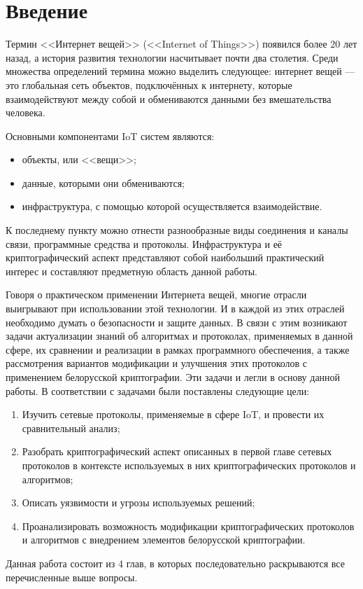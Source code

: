 \chapter*{Введение}
 
 	Термин <<Интернет вещей>> (<<Internet of Things>>) появился более 20 лет назад, а история развития
 	технологии насчитывает почти два столетия. Среди множества определений термина можно выделить
 	следующее: интернет вещей --- это глобальная сеть объектов, подключённых к интернету, которые 
 	взаимодействуют между собой и обмениваются данными без вмешательства человека.
 	
 	Основными компонентами IoT систем являются:
 	\begin{itemize}
 		\item объекты, или <<вещи>>;
 		\item данные, которыми они обмениваются;
 		\item инфраструктура, с помощью которой осуществляется взаимодействие.
 	\end{itemize}
 	К последнему пункту можно отнести разнообразные виды соединения и каналы связи, программные 
 	средства и протоколы. Инфраструктура и её криптографический аспект представляют собой наибольший
 	практический интерес и составляют предметную область данной работы.
 	
 	Говоря о практическом применении Интернета вещей, многие отрасли выигрывают при использовании
 	этой технологии. И в каждой из этих отраслей необходимо думать о безопасности и защите данных.
 	В связи с этим возникают задачи актуализации знаний об алгоритмах и протоколах, применяемых в
 	данной сфере, их сравнении и реализации в рамках программного обеспечения, а также рассмотрения
 	вариантов модификации и улучшения этих протоколов с применением белорусской криптографии. Эти
 	задачи и легли в основу данной работы. В соответствии с задачами были поставлены следующие цели:
 	
 	\begin{enumerate}
 		\item Изучить сетевые протоколы, применяемые в сфере IoT, и провести их сравнительный анализ;
 		\item Разобрать криптографический аспект описанных в первой главе сетевых протоколов в контексте
 		используемых в них криптографических протоколов и алгоритмов;
 		\item Описать уязвимости и угрозы используемых решений;
 		\item Проанализировать возможность модификации криптографических протоколов и алгоритмов с
 		внедрением элементов белорусской криптографии.
 	\end{enumerate}
 	
 	Данная работа состоит из 4 глав, в которых последовательно раскрываются все перечисленные выше
 	вопросы.
